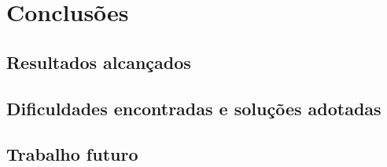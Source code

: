 \section{Conclusões}

\subsection{Resultados alcançados}
\subsection{Dificuldades encontradas e soluções adotadas}
\subsection{Trabalho futuro}